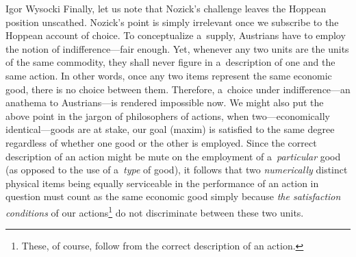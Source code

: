 \begin{artengenv}{Igor Wysocki}
Finally, let us note that Nozick's challenge leaves the Hoppean position unscathed. Nozick's point is simply irrelevant once we subscribe to the Hoppean account of choice. To conceptualize a~supply, Austrians have to employ the notion of indifference---fair enough. Yet, whenever any two units are the units of the same commodity, they shall never figure in a~description of one and the same action. In other words, once any two items represent the same economic good, there is no choice between them. Therefore, a~choice under indifference---an anathema to Austrians---is rendered impossible now. We might also put the above point in the jargon of philosophers of actions, when two---economically identical---goods are at stake, our goal (maxim) is satisfied to the same degree regardless of whether one good or the other is employed. Since the correct description of an action might be mute on the employment of a~\textit{particular} good (as opposed to the use of a~\textit{type} of good), it follows that two \textit{numerically} distinct physical items being equally serviceable in the performance of an action in question must count as the same economic good simply because \textit{the satisfaction conditions} of our actions\footnote{These, of course, follow from the correct description of an action.} do not discriminate between these two units.


\end{artengenv}

